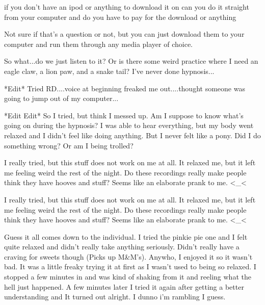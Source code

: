 \documentclass[ebook,12pt,oneside,openany]{memoir}
\newcommand{\mytexttilde}{\raisebox{0.5ex}{\texttildelow}}
\begin{document}
\begin{tcolorbox}[title=Lord Bababa,colback=red!5!white,colframe=red!75!black,coltitle=white]
\begin{tcolorbox}[title=\mytexttilde{}TheStealthyPony\mytexttilde{}]
\par{if you don't have an ipod or anything to download it on can you do it straight from your computer and do you have to pay for the download or anything}
\end{tcolorbox}
\par{Not sure if that's a question or not, but you can just download them to your computer and run them through any media player of choice.}
\end{tcolorbox}
\begin{tcolorbox}[title=SongBrony]
\par{So what...do we just listen to it? Or is there some weird practice where I need an eagle claw, a lion paw, and a snake tail? I've never done hypnosis...}
\newline{}
\par{*Edit* Tried RD....voice at beginning freaked me out....thought someone was going to jump out of my computer...}
\newline{}
\par{*Edit Edit* So I tried, but think I messed up. Am I suppose to know what's going on during the hypnosis? I was able to hear everything, but my body went relaxed and I didn't feel like doing anything. But I never felt like a pony. Did I do something wrong? Or am I being trolled?}
\end{tcolorbox}
\begin{tcolorbox}[title=TailsIsNotAlone]
\par{I really tried, but this stuff does not work on me at all. It relaxed me, but it left me feeling weird the rest of the night. Do these recordings really make people think they have hooves and stuff? Seems like an elaborate prank to me. <\_<}
\end{tcolorbox}
\begin{tcolorbox}[title=thor9356]
\begin{tcolorbox}[title=TailsIsNotAlone]
\par{I really tried, but this stuff does not work on me at all. It relaxed me, but it left me feeling weird the rest of the night. Do these recordings really make people think they have hooves and stuff? Seems like an elaborate prank to me. <\_<}
\end{tcolorbox}
\par{Guess it all comes down to the individual. I tried the pinkie pie one and I felt quite relaxed and didn't really take anything seriously. Didn't really have a craving for sweets though (Picks up M\&M's). Anywho, I enjoyed it so it wasn't bad. It was a little freaky trying it at first as I wasn't used to being so relaxed. I stopped a few minutes in and was kind of shaking from it and reeling what the hell just happened. A few minutes later I tried it again after getting a better understanding and It turned out alright. I dunno i'm rambling I guess. }
\end{tcolorbox}
\end{document}

